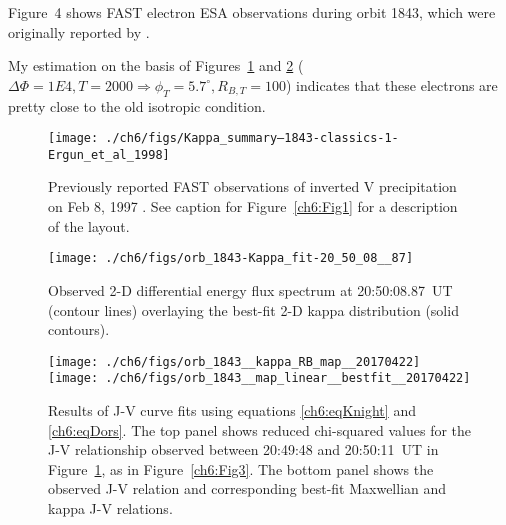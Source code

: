   Figure~4 shows FAST electron ESA observations during orbit 1843,
  which were originally reported by \citet{Ergun1998a}. 

  My estimation on the basis of Figures~\ref{ch6:Fig4} and \ref{ch6:Fig5}
  ($\Delta \Phi = 1E4, T = 2000 \Rightarrow \phi_T = 5.7^\circ,
  R_{B,T} = 100$) indicates that these electrons are pretty close to
  the old isotropic condition.


  \begin{figure}
    \centering
    \noindent\texttt{[image: ./ch6/figs/Kappa\_summary--1843-classics-1-Ergun\_et\_al\_1998]}
    \caption[Inverted V precipitation observed by FAST during orbit
    1843, and best-fit Maxwellian and kappa distribution
    parameters]{Previously reported FAST observations of inverted V
      precipitation on Feb 8, 1997 \citep{Ergun1998a}. See caption for
      Figure~\ref{ch6:Fig1} for a description of the layout.}
    \label{ch6:Fig4}
  \end{figure}



  \begin{figure}
    \centering
    \noindent\texttt{[image: ./ch6/figs/orb\_1843-Kappa\_fit-20\_50\_08\_\_87]}
    \caption[Example of two-dimensional fit of inverted-V electron
    distribution functions during Orbit 1843.]{Observed 2-D
      differential energy flux spectrum at 20:50:08.87~UT (contour
      lines) overlaying the best-fit 2-D kappa distribution (solid
      contours).}
    \label{ch6:Fig5}
  \end{figure}



  \begin{figure}
    \centering
    \noindent\texttt{[image: ./ch6/figs/orb\_1843\_\_kappa\_RB\_map\_\_20170422]}
    \noindent\texttt{[image: ./ch6/figs/orb\_1843\_\_map\_linear\_\_bestfit\_\_20170422]}
    \caption[Orbit 1843: Reduced chi-squared values for observed J-V
    curves and corresponding best-fit J-V curves.]{Results of J-V
      curve fits using equations \ref{ch6:eqKnight} and
      \ref{ch6:eqDors}. The top panel shows reduced chi-squared values
      for the J-V relationship observed between 20:49:48 and
      20:50:11~UT in Figure~\ref{ch6:Fig4}, as in
      Figure~\ref{ch6:Fig3}. The bottom panel shows the observed J-V
      relation and corresponding best-fit Maxwellian and kappa J-V relations.}
    \label{ch6:Fig6}
  \end{figure}

